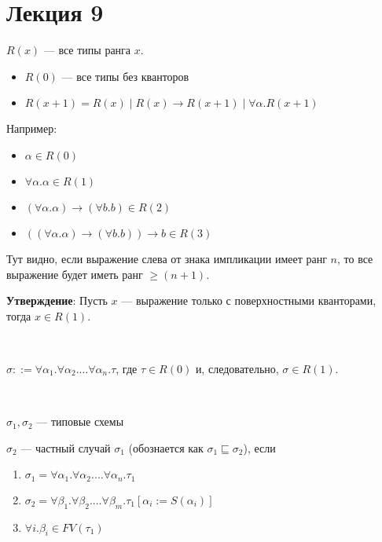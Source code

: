 \section{Лекция 9}

\newcommand{\idr}[1]{\texttt{#1}}

\begin{definition}
$R(x)$ --- все типы ранга $x$.
\begin{itemize}
    \item $R(0)$ --- все типы без кванторов
    \item $R(x + 1) = R(x) \mid R(x) \rightarrow R(x + 1) \mid \forall \alpha.R(x + 1)$
\end{itemize}
\end{definition}

Например:
\begin{paracol}{2}
\begin{itemize}
    \item $\alpha \in R(0)$
    \item $\forall \alpha.\alpha \in R(1)$
    \item $(\forall \alpha.\alpha) \rightarrow (\forall b.b) \in R(2)$
    \item $((\forall \alpha.\alpha) \rightarrow (\forall b.b)) \rightarrow b \in R(3)$
\end{itemize}
\switchcolumn
Тут видно, если выражение слева от знака импликации имеет ранг $n$, то все выражение будет иметь ранг $\geq (n + 1)$.
\end{paracol}

\textbf{Утверждение}: Пусть $x$ --- выражение только с поверхностными кванторами, тогда $x \in R(1)$.

\begin{definition}\

$\sigma ::= \forall \alpha_1. \forall \alpha_2. \dots \forall \alpha_n. \tau$, где $\tau \in R(0)$ и, следовательно, $\sigma \in R(1)$.

\end{definition}

\begin{definition}\

$\sigma_1, \sigma_2$ --- типовые схемы

$\sigma_2$ --- частный случай $\sigma_1$ (обознается как $\sigma_1 \sqsubseteq \sigma_2$), если

\begin{enumerate}
    \item $\sigma_1 =  \forall \alpha_1. \forall \alpha_2. \dots \forall \alpha_n. \tau_1$
    \item $\sigma_2 =  \forall \beta_1. \forall \beta_2. \dots \forall \beta_m. \tau_1[\alpha_i := S(\alpha_i)]$
    \item $\forall i. \beta_i \in FV(\tau_1)$
\end{enumerate}

\end{definition}

